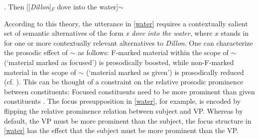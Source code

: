 \documentclass[preprint,review,12pt,authoryear,times]{elsarticle}
\begin{document}
\ex. Then [[{\em Dillon}]$_F$ dove into the water]$\sim$\label{waterFoc}

According to this theory, the utterance in \ref{water} requires a contextually salient set of semantic alternatives of the form  {\em x dove into the water}, where $x$ stands in for one or more contextually relevant alternatives to {\em Dillon}. One can characterize the prosodic effect of $\sim$ as follows: F-marked material within the scope of $\sim$ (`material marked as focused') is prosodically boosted, while non-F-marked material in the scope of $\sim$ (`material marked as given') is prosodically reduced  (cf. \citealt{rooth92b,truck95}). This can be thought of a constraint on  the relative prosodic prominence between constituents: Focused constituents need to be more prominent than given constituents \citep[cf.][]{willi97,  szend03, wagner05recursion, reinh06, burin16b}. The focus presupposition in \ref{water}, for example, is encoded by flipping the relative prominence relation between subject and VP. Whereas by default, the VP must be more prominent than the subject, the focus structure in \ref{water} has the effect that the subject must be more prominent than the VP. 
\end{document}
